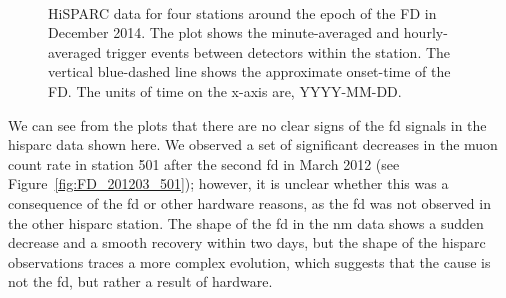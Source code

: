 \begin{figure}[ht]
	\centering
	 \\
	
	\qquad
	
	
	\caption{HiSPARC data for four stations around the epoch of the FD in December 2014. The plot shows the minute-averaged and hourly-averaged trigger events between detectors within the station. The vertical blue-dashed line shows the approximate onset-time of the FD. The units of time on the x-axis are, YYYY-MM-DD.}
	\label{fig:FD_201412}
\end{figure}


We can see from the plots that there are no clear signs of the \gls{fd} signals in the \gls{hisparc} data shown here. We observed a set of significant decreases in the muon count rate in station 501 after the second \gls{fd} in March 2012 (see Figure~\ref{fig:FD_201203_501}); however, it is unclear whether this was a consequence of the \gls{fd} or other hardware reasons, as the \gls{fd} was not observed in the other \gls{hisparc} station. The shape of the \gls{fd} in the \gls{nm} data shows a sudden decrease and a smooth recovery within two days, but the shape of the \gls{hisparc} observations traces a more complex evolution, which suggests that the cause is not the \gls{fd}, but rather a result of hardware.


